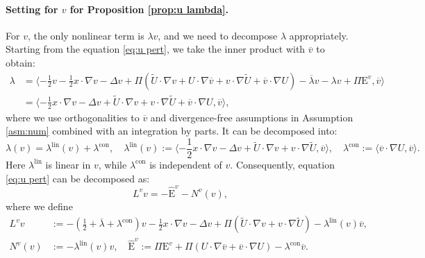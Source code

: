 \documentclass[11pt,a4paper]{article}
\numberwithin{equation}{section}
\newcommand{\Epsilon}{\mathrm{E}}
\newcommand{\assign}{:=}
\newcommand{\cdummy}{\cdot}
\begin{document}
\paragraph{Setting for $v$ for Proposition \ref{prop:u lambda}.}
For $v$, the only nonlinear term is $\lambda v$, and we need to decompose $\lambda$ appropriately. Starting from the equation
\eqref{eq:u pert}, we take the inner product with $\overline{v}$ to obtain:
\begin{align*}
  \lambda & =  \langle - \frac{1}{2} v - \frac{1}{2} x \cdummy \nabla v
  - \Delta v + \Pi (\widetilde{U} \cdot \nabla v + U \cdot \nabla \overline{v} + v
  \cdot \nabla \widetilde{U} + \overline{v} \cdot \nabla U) - \overline{\lambda} v
  - \lambda v + \Pi\Epsilon^v, \overline{v} \rangle\\
  & =  \langle - \frac{1}{2} x \cdummy \nabla v - \Delta v + \widetilde{U}
  \cdot \nabla v + v \cdot \nabla \widetilde{U} +
  \overline{v} \cdot \nabla U, \overline{v} \rangle ,
\end{align*}
where we use orthogonalities to $\overline{v}$ and divergence-free assumptions in Assumption \ref{asm:num} combined with an integration by parts.
It can be decomposed into:
\begin{equation*}
  \lambda (v) = \lambda^\text{lin} (v) + \lambda^\text{con},\quad
  \lambda^\text{lin} (v)  \assign  \langle - \frac{1}{2} x \cdummy \nabla v -
  \Delta v + \widetilde{U} \cdot \nabla v + v \cdot \nabla \widetilde{U}, \overline{v}
  \rangle,\quad
  \lambda^\text{con}  \assign \langle \overline{v}
  \cdot \nabla U, \overline{v} \rangle .
\end{equation*}
Here $\lambda^\text{lin}$ is linear in $v$, while $\lambda^\text{con}$ is independent of $v$. Consequently, equation
\eqref{eq:u pert} can be decomposed as:
\[ L^v v =  - \widehat{\Epsilon}^v-N^v (v), \]
where we define\begin{equation}
  \label{v-def-eqn}
\begin{aligned}
  L^v v & \assign - ( \frac{1}{2} + \overline{\lambda} + \lambda^\text{con}
  ) v - \frac{1}{2} x \cdummy \nabla v - \Delta v + \Pi (\widetilde{U} \cdot
  \nabla v + v \cdot \nabla \widetilde{U})  - \lambda^\text{lin} (v) \overline{v},\\
  N^v (v) & \assign  -\lambda^\text{lin} (v) v,\quad
  \widehat{\Epsilon}^v  \assign  \Pi\Epsilon^v + \Pi (U \cdot \nabla \overline{v} +
  \overline{v} \cdot \nabla U) - \lambda^\text{con} \overline{v} .
\end{aligned}\end{equation}
\end{document}
